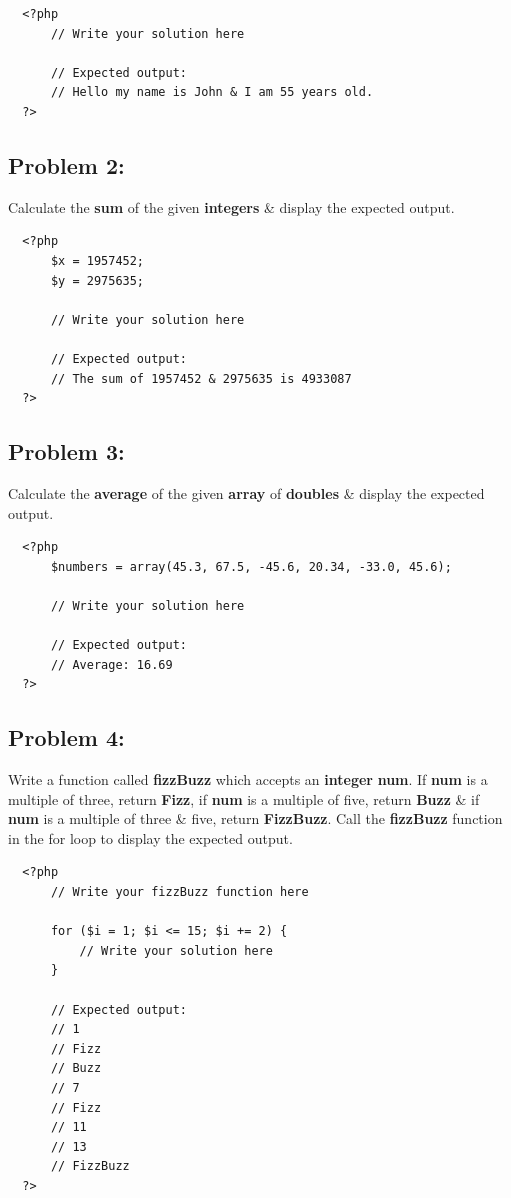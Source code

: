 \documentclass{article}
\begin{document}
\begin{verbatim}
  <?php
      // Write your solution here

      // Expected output:
      // Hello my name is John & I am 55 years old.
  ?>
\end{verbatim}

\subsection*{Problem 2:} 
Calculate the \textbf{sum} of the given \textbf{integers} \& display the expected output.

\begin{verbatim}
  <?php
      $x = 1957452;
      $y = 2975635;

      // Write your solution here

      // Expected output:
      // The sum of 1957452 & 2975635 is 4933087
  ?>
\end{verbatim}

\subsection*{Problem 3:} 
Calculate the \textbf{average} of the given \textbf{array} of \textbf{doubles} \& display the expected output.

\begin{verbatim}
  <?php
      $numbers = array(45.3, 67.5, -45.6, 20.34, -33.0, 45.6);

      // Write your solution here

      // Expected output:
      // Average: 16.69 
  ?>
\end{verbatim}

\subsection*{Problem 4:}
Write a function called \textbf{fizzBuzz} which accepts an \textbf{integer} \textbf{num}. If \textbf{num} is a multiple of three, return \textbf{Fizz}, if \textbf{num} is a multiple of five, return \textbf{Buzz} \& if \textbf{num} is a multiple of three \& five, return \textbf{FizzBuzz}. Call the \textbf{fizzBuzz} function in the for loop to display the expected output.

\begin{verbatim}
  <?php
      // Write your fizzBuzz function here
      
      for ($i = 1; $i <= 15; $i += 2) {
          // Write your solution here
      }

      // Expected output:
      // 1
      // Fizz 
      // Buzz
      // 7
      // Fizz
      // 11
      // 13
      // FizzBuzz
  ?>
\end{verbatim}
\end{document}
